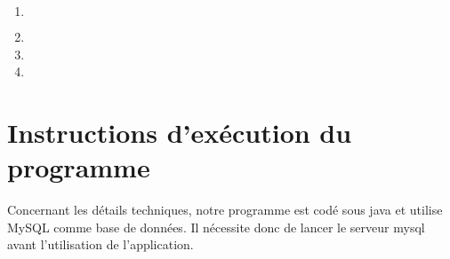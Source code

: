 \documentclass[a4paper,10pt]{article}
\begin{document}
	\begin{enumerate}
	    \item
		\begin{equation}
		[u.* | \ U(u) \ \wedge \forall \underset{\ \ 2}{u} (U(\underset{\ \ 2}{u}) \rightarrow (( \forall f ( F(f) \rightarrow (f.status = False \wedge(f.mail\_sender = \underset{\ \ 2}{u}.mail \vee 
		\end{equation}
		\begin{equation}
		f.mail\_receiver = \underset{\ \ 2}{u}.mail)))) \vee ( \exists \underset{\ \ 2}{f} (F(\underset{\ \ 2}{f}) \rightarrow (\underset{\ \ 2}{f}.status = True \wedge(\underset{\ \ 2}{f}.mail\_sender = \underset{\ \ 2}{u}.mail \vee 
		\end{equation}  
		\begin{equation}
		\underset{\ \ 2}{f}.mail\_receiver = \underset{\ \ 2}{u}.mail)))) \vee ( \exists \underset{\ \ 3}{f} \underset{\ \ 4}{f} (F(\underset{\ \ 3}{f} ) \rightarrow (\underset{\ \ 3}{f}.status = True \wedge (\underset{\ \ 3}{f}.mail\_sender = \underset{\ \ 2}{u}.mail \vee
		\end{equation}  
		\begin{equation}
		\underset{\ \ 3}{f}.mail\_receiver = \underset{\ \ 2}{u}.mail))) \wedge F(\underset{\ \ 4}{f}) \rightarrow (\underset{\ \ 4}{f}.status = True \wedge (\underset{\ \ 4}{f}.mail\_sender = \underset{\ \ 2}{u}.mail \vee
		\end{equation}
		\begin{equation}
		\underset{\ \ 4}{f}.mail\_receiver = \underset{\ \ 2}{u}.mail)) \wedge (\underset{\ \ 3}{f} \ != \underset{\ \ 4}{f}))))]
		\end{equation}
	    \item
	    \item 
	    \item
	\end{enumerate}

\section{Instructions d'exécution du programme}

Concernant les détails techniques, notre programme est codé sous java et utilise MySQL comme base de données. Il nécessite donc de lancer le serveur mysql avant l'utilisation de l'application.
\end{document}
